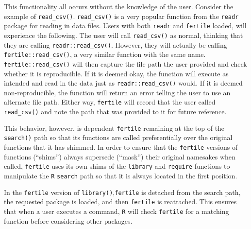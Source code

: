 \documentclass[12pt,twoside]{reedthesis}
\begin{document}
This functionality all occurs without the knowledge of the user. Consider the example of \texttt{read\_csv()}. \texttt{read\_csv()} is a very popular function from the \texttt{readr} package for reading in data files. Users with both \texttt{readr} and \texttt{fertile} loaded, will experience the following. The user will call \texttt{read\_csv()} as normal, thinking that they are calling \texttt{readr::read\_csv()}. However, they will actually be calling \texttt{fertile::read\_csv()}, a very similar function with the same name. \texttt{fertile::read\_csv()} will then capture the file path the user provided and check whether it is reproducible. If it is deemed okay, the function will execute as intended and read in the data just as \texttt{readr::read\_csv()} would. If it is deemed non-reproducible, the function will return an error telling the user to use an alternate file path. Either way, \texttt{fertile} will record that the user called \texttt{read\_csv()} and note the path that was provided to it for future reference.

This behavior, however, is dependent \texttt{fertile} remaining at the top of the \texttt{search()} path so that its functions are called preferentially over the original functions that it has shimmed. In order to ensure that the \texttt{fertile} versions of functions (``shims'') always supersede (``mask'') their original namesakes when called, \texttt{fertile} uses its own shims of the \texttt{library} and \texttt{require} functions to manipulate the \texttt{R} \texttt{search} path so that it is always located in the first position.

In the \texttt{fertile} version of \texttt{library()},\texttt{fertile} is detached from the search path, the requested package is loaded, and then \texttt{fertile} is reattached. This ensures that when a user executes a command, \texttt{R} will check \texttt{fertile} for a matching function before considering other packages.
\end{document}
